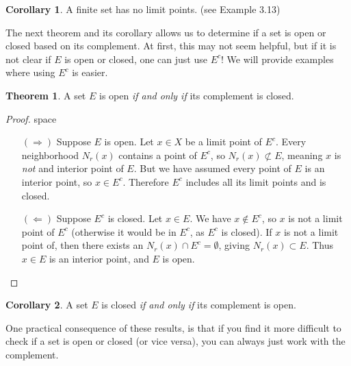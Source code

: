 \documentclass{article}
\theoremstyle{definition}
\newtheorem{theorem}{Theorem}[section]
\newtheorem{corollary}{Corollary}[section]
\begin{document}
\begin{corollary}
A finite set has no limit points. (see Example 3.13)
\end{corollary}
The next theorem and its corollary allows us to determine if a set is open or closed based on its complement. At first, this may not seem helpful, but if it is not clear if $ E $ is open or closed, one can just use $ E^c $! We will provide examples where using $ E^c $ is easier.
\begin{theorem}
	A set $ E $ is open \textit{if and only if} its complement is closed.
\end{theorem}
\begin{proof}{\color{white}space}
	\begin{enumerate}
		\item [$ (\Longrightarrow) $] Suppose $ E $ is open. Let $ x\in X $ be a limit point of $ E^c $. Every neighborhood $ N_r(x) $ contains a point of $ E^c $, so $ N_r(x)\not\subset E $, meaning $ x $ is \textit{not} and interior point of $ E $. But we have assumed every point of $ E $ is an interior point, so $ x\in E^c $. Therefore $ E^c $ includes all its limit points and is closed.   
		\item [$ (\Longleftarrow) $] Suppose $ E^c $ is closed. Let $ x\in E $. We have $ x\notin E^c $, so $ x $ is not a limit point of $ E^c $ (otherwise it would be in $ E^c $, as $ E^c $ is closed). If $ x $ is not a limit point of, then there exists an $ N_r(x)\cap E^c=\emptyset $, giving $ N_r(x)\subset E $. Thus $ x\in E $ is an interior point, and $ E $ is open.  
	\end{enumerate}
\end{proof}
\begin{corollary}
	A set $ E $ is closed \textit{if and only if} its complement is open.
\end{corollary}
One practical consequence of these results, is that if you find it more difficult to check if a set is open or closed (or vice versa), you can always just work with the complement. 
\end{document}

